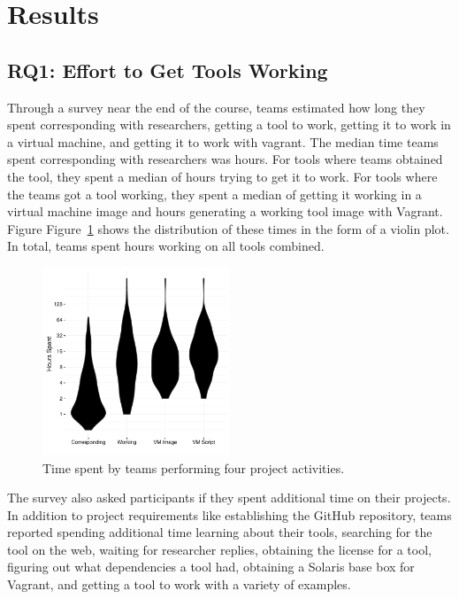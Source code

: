 \documentclass[10pt,conference]{IEEEtran}
\begin{document}
\section{Results}

\subsection{RQ1: Effort to Get Tools Working}

Through a survey near the end of the course, 
teams estimated how long they spent
corresponding with researchers,
getting a tool to work,
getting it to work in a virtual machine,
and getting it to work with vagrant.
The median time teams spent corresponding with
researchers was \durationCorresponding hours.
For tools where teams obtained the tool,
they spent a median of \durationWorking hours
trying to get it to work.
For tools where the teams got a tool working,
they spent a median of \durationVM getting it working 
in a virtual machine image and
\durationVagrant hours generating a working tool
image with Vagrant.
Figure
Figure~\ref{fig:duration} shows the distribution of
these times in the form of a violin plot.
In total, teams spent \durationTotal hours working
on all tools combined.

\begin{figure}[!ht]
  \centering
    \includegraphics[width=0.5\textwidth]{durations.pdf}
  \caption{Time spent by teams performing four project activities.}\label{fig:duration}
\end{figure}

The survey also asked participants if they spent
additional time on their projects.
In addition to project requirements like establishing
the GitHub repository, teams 
reported spending additional time 
learning about their tools,
searching for the tool on the web,
waiting for researcher replies,
obtaining the license for a tool,
figuring out what dependencies a tool had,
obtaining a Solaris base box for Vagrant,
and
getting a tool to work with a variety of examples.
\end{document}
